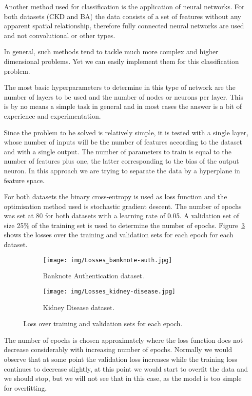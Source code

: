 \documentclass[11pt,a4paper]{article}
\begin{document}
Another method used for classification is the application of neural networks. For both datasets (CKD and BA) the data consists of a set of features without any apparent spatial relationship, therefore fully connected neural networks are used and not convolutional or other types. 

In general, such methods tend to tackle much more complex and higher dimensional problems. Yet we can easily implement them for this classification problem. 

The most basic hyperparameters to determine in this type of network are the number of layers to be used and the number of nodes or neurons per layer. This is by no means a simple task in general and in most cases the answer is a bit of experience and experimentation. 

Since the problem to be solved is relatively simple, it is tested with a single layer, whose number of inputs will be the number of features according to the dataset and with a single output. The number of parameters to train is equal to the number of features plus one, the latter corresponding to the bias of the output neuron. In this approach we are trying to separate the data by a hyperplane in feature space.

For both datasets the binary cross-entropy is used as loss function and the optimisation method used is stochastic gradient descent. The number of epochs was set at 80 for both datasets with a learning rate of 0.05. A validation set of size 25\% of the training set is used to determine the number of epochs. Figure~\ref{lossesNN} shows the losses over the training and validation sets for each epoch for each dataset. 

\begin{figure}[H]
\centering
\begin{subfigure}{.5\textwidth}
  \centering
  \texttt{[image: img/Losses\_banknote-auth.jpg]}
  \caption{Banknote Authentication dataset.}
  \label{fig:sub1}
\end{subfigure}%
\begin{subfigure}{.5\textwidth}
  \centering
  \texttt{[image: img/Losses\_kidney-disease.jpg]}
  \caption{Kidney Disease dataset.}
  \label{fig:sub2}
\end{subfigure}
\caption{Loss over training and validation sets for each epoch.}
\label{lossesNN}
\end{figure}

The number of epochs is chosen approximately where the loss function does not decrease considerably with increasing number of epochs. Normally we would observe that at some point the validation loss increases while the training loss continues to decrease slightly, at this point we would start to overfit the data and we should stop, but we will not see that in this case, as the model is too simple for overfitting. 
\end{document}
